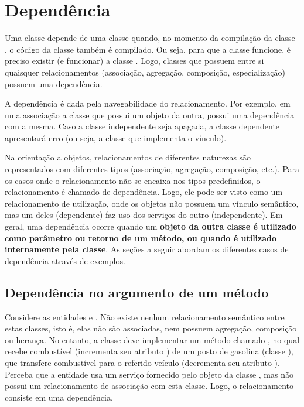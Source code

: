 \chapter{Dependência}

Uma classe  depende de uma classe  quando, no momento da compilação da classe , o código da classe  também é compilado. Ou seja, para que a classe  funcione, é preciso existir (e funcionar) a classe . Logo, classes que possuem entre si quaisquer relacionamentos (associação, agregação, composição, especialização) possuem uma dependência.

A dependência é dada pela navegabilidade do relacionamento. Por exemplo, em uma associação a classe que possui um objeto da outra, possui uma dependência com a mesma. Caso a classe independente seja apagada, a classe dependente apresentará erro (ou seja, a classe que implementa o vínculo).

Na orientação a objetos, relacionamentos de diferentes naturezas são representados com diferentes tipos (associação, agregação, composição, etc.). Para os casos onde o relacionamento não se encaixa nos tipos predefinidos, o relacionamento é chamado de dependência. Logo, ele pode ser visto como um relacionamento de utilização, onde os objetos não possuem um vínculo semântico, mas um deles (dependente) faz uso dos serviços do outro (independente). Em geral, uma dependência ocorre quando um \textbf{objeto da outra classe é utilizado como parâmetro ou retorno de um método, ou quando é utilizado internamente pela classe}. As seções a seguir abordam os diferentes casos de dependência através de exemplos.

\section{Dependência no argumento de um método}

Considere as entidades  e . Não existe nenhum relacionamento semântico entre estas classes, isto é, elas não são associadas, nem possuem agregação, composição ou herança. No entanto, a classe  deve implementar um método chamado , no qual recebe combustível (incrementa seu atributo ) de um posto de gasolina (classe ), que transfere combustível para o referido veículo (decrementa seu atributo ). Perceba que a entidade  usa um serviço fornecido pelo objeto da classe , mas não possui um relacionamento de associação com esta classe. Logo, o relacionamento consiste em uma dependência.

